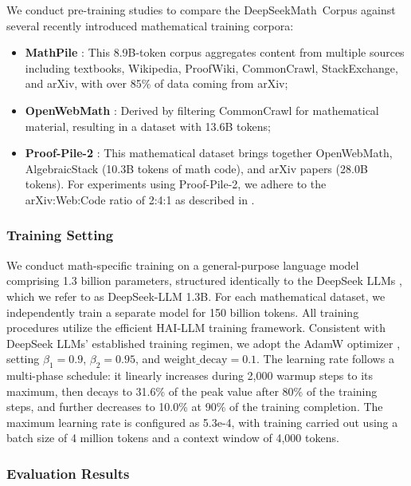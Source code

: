 We conduct pre-training studies to compare the DeepSeekMath~Corpus against several recently introduced mathematical training corpora:

\begin{itemize}[topsep=0pt]
    \item \textbf{MathPile} \citep{mathpile}: This 8.9B-token corpus aggregates content from multiple sources including textbooks, Wikipedia, ProofWiki, CommonCrawl, StackExchange, and arXiv, with over 85\% of data coming from arXiv;
    \item \textbf{OpenWebMath} \citep{openwebmath}: Derived by filtering CommonCrawl for mathematical material, resulting in a dataset with 13.6B tokens;
    \item \textbf{Proof-Pile-2} \citep{llemma}: This mathematical dataset brings together OpenWebMath, AlgebraicStack (10.3B tokens of math code), and arXiv papers (28.0B tokens). For experiments using Proof-Pile-2, we adhere to the arXiv:Web:Code ratio of 2:4:1 as described in \cite{llemma}.
\end{itemize}

\subsubsection{Training Setting}
\label{sec:quality-policy}
We conduct math-specific training on a general-purpose language model comprising 1.3 billion parameters, structured identically to the DeepSeek LLMs \citep{deepseek-llm}, which we refer to as DeepSeek-LLM 1.3B. For each mathematical dataset, we independently train a separate model for 150 billion tokens. All training procedures utilize the efficient HAI-LLM \citep{haillm} training framework. Consistent with DeepSeek LLMs’ established training regimen, we adopt the AdamW optimizer \citep{adamW}, setting $\beta_1=0.9$, $\beta_2=0.95$, and $\mathrm{weight\_decay}=0.1$. The learning rate follows a multi-phase schedule: it linearly increases during 2{,}000 warmup steps to its maximum, then decays to 31.6\% of the peak value after 80\% of the training steps, and further decreases to 10.0\% at 90\% of the training completion. The maximum learning rate is configured as 5.3e-4, with training carried out using a batch size of 4 million tokens and a context window of 4,000 tokens.

\subsubsection{Evaluation Results}

